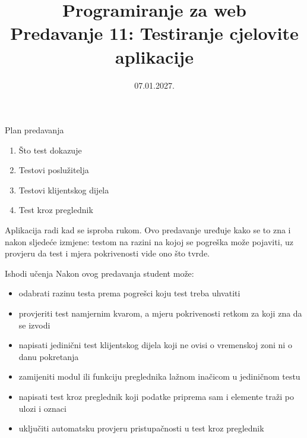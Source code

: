 

\title[Predavanje 11: Testiranje]{Programiranje za web \\ Predavanje 11: Testiranje cjelovite aplikacije}
\date{07.01.2027.}



\frame{\titlepage}

\begin{frame}{Plan predavanja}
\begin{enumerate}
  \item Što test dokazuje
  \item Testovi poslužitelja
  \item Testovi klijentskog dijela
  \item Test kroz preglednik
\end{enumerate}

\vspace{0.6em}
Aplikacija radi kad se isproba rukom. Ovo predavanje uređuje kako se to zna i nakon sljedeće izmjene: testom na razini na kojoj se pogreška može pojaviti, uz provjeru da test i mjera pokrivenosti vide ono što tvrde.
\end{frame}

\begin{frame}{Ishodi učenja}
Nakon ovog predavanja student može:

\begin{itemize}
  \item odabrati razinu testa prema pogrešci koju test treba uhvatiti
  \item provjeriti test namjernim kvarom, a mjeru pokrivenosti retkom za koji zna da se izvodi
  \item napisati jedinični test klijentskog dijela koji ne ovisi o vremenskoj zoni ni o danu pokretanja
  \item zamijeniti modul ili funkciju preglednika lažnom inačicom u jediničnom testu
  \item napisati test kroz preglednik koji podatke priprema sam i elemente traži po ulozi i oznaci
  \item uključiti automatsku provjeru pristupačnosti u test kroz preglednik
\end{itemize}
\end{frame}

